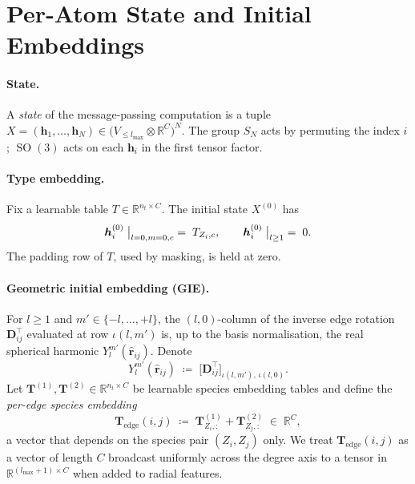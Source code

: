 \documentclass[11pt,a4paper]{article}
\DeclareMathOperator{\SO}{SO}
\newcommand{\R}{\mathbb{R}}
\newcommand{\brh}{\hat{\bm{r}}}
\newcommand{\bh}{\bm{h}}
\newcommand{\Te}{\bm{T}}
\newcommand{\bD}{\bm{D}}
\newcommand{\lmax}{l_{\max}}
\theoremstyle{plain}
\theoremstyle{definition}
\theoremstyle{remark}
\begin{document}
    \section{Per-Atom State and Initial Embeddings}\label{sec:init}

    \paragraph{State.}
    A \emph{state} of the message-passing computation is a tuple
$X=(\bh_1,\dots,\bh_N)\in\bigl(V_{\le\lmax}\otimes\R^C\bigr)^{N}$. The group
$S_N$ acts by permuting the index $i$; $\SO(3)$ acts on each $\bh_i$ in the
    first tensor factor.

    \paragraph{Type embedding.}
    Fix a learnable table $T\in\R^{n_t\times C}$. The initial state $X^{(0)}$ has
    \begin{equation}\label{eq:type}
        \bh_i^{(0)}\bigm|_{l=0,m=0,c}\;=\;T_{Z_i,c},\qquad \bh_i^{(0)}\bigm|_{l\geq 1}\;=\;0.
    \end{equation}
    The padding row of $T$, used by masking, is held at zero.

    \paragraph{Geometric initial embedding (GIE).}
    For $l\geq 1$ and $m'\in\{-l,\dots,+l\}$, the $(l,0)$-column of the inverse
    edge rotation $\bD_{ij}^{\top}$ evaluated at row $\iota(l,m')$ is, up to the
    basis normalisation, the real spherical harmonic $Y_l^{m'}(\brh_{ij})$. Denote
    \begin{equation}\label{eq:Y}
        Y_l^{m'}(\brh_{ij})\;\coloneqq\;\bigl[\bD_{ij}^{\top}\bigr]_{\iota(l,m'),\,\iota(l,0)}.
    \end{equation}
    Let $\Te^{(1)},\Te^{(2)}\in\R^{n_t\times C}$ be learnable species embedding tables and define the \emph{per-edge species embedding}
    \begin{equation}\label{eq:Tedge}
        \Te_{\mathrm{edge}}(i,j) \;\coloneqq\; \Te^{(1)}_{Z_i,:}+\Te^{(2)}_{Z_j,:} \;\in\;\R^{C},
    \end{equation}
    a vector that depends on the species pair $(Z_i,Z_j)$ only.
    We treat $\Te_{\mathrm{edge}}(i,j)$ as a vector of length $C$ broadcast uniformly across the degree axis to a tensor in $\R^{(\lmax+1)\times C}$ when added to radial features.
\end{document}
